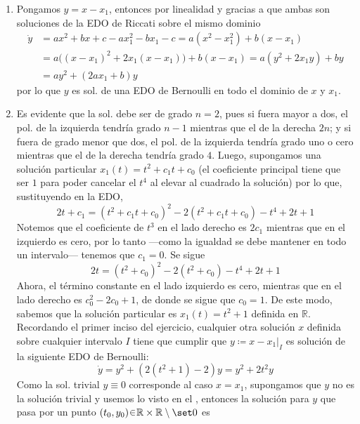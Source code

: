 \begin{sol}
\begin{enumerate}[label = (\alph*)]
    \item Pongamos $y = x - x_1$, entonces por linealidad y gracias a que ambas son soluciones de la EDO de Riccati sobre el mismo dominio
    \begin{align*}
        \dot{y}%
        &= ax^2 + bx + c - ax_1^2 - bx_1 - c = a(x^2 - x_1^2) + b(x-x_1)\\
        &= a\big((x - x_1)^2 + 2x_1(x - x_1)\big) + b(x - x_1)%
        = a(y^2 + 2x_1y) + by\\
        &= ay^2 + (2ax_1 + b)y
    \end{align*}
    por lo que $y$ es sol. de una EDO de Bernoulli en todo el dominio de $x$ y $x_1$.

    \item Es evidente que la sol. debe ser de grado $n=2$, pues si fuera mayor a dos, el pol. de la izquierda tendría grado $n-1$ mientras que el de la derecha $2n$; y si fuera de grado menor que dos, el pol. de la izquierda tendría grado uno o cero mientras que el de la derecha tendría grado $4$. Luego, supongamos una solución particular $x_1(t) = t^2 + c_1t + c_0$ (el coeficiente principal tiene que ser $1$ para poder cancelar el $t^4$ al elevar al cuadrado la solución) por lo que, sustituyendo en la EDO, 
    \[
        2t + c_1 = (t^2 + c_1t + c_0)^2 - 2(t^2 + c_1t + c_0) - t^4 + 2t + 1
    \]
    Notemos que el coeficiente de $t^3$ en el lado derecho es $2c_1$ mientras que en el izquierdo es cero, por lo tanto ---como la igualdad se debe mantener en todo un intervalo--- tenemos que $c_1 = 0$. Se sigue
    \[
        2t = (t^2 + c_0)^2 - 2(t^2 + c_0) - t^4 + 2t + 1
    \]
    Ahora, el término constante en el lado izquierdo es cero, mientras que en el lado derecho es $c_0^2 - 2c_0 + 1$, de donde se sigue que $c_0 = 1$. De este modo, sabemos que la solución particular es $x_1(t) = t^2 + 1$ definida en $\mathbb{R}$. Recordando el primer inciso del ejercicio, cualquier otra solución $x$ definida sobre cualquier intervalo $I$ tiene que cumplir que $y \coloneq x - x_1|_I$ es solución de la siguiente EDO de Bernoulli:
    \[
        \dot{y} = y^2 + (2(t^2 + 1) - 2)y = y^2 + 2t^2y
    \]
    Como la sol. trivial $y \equiv 0$ corresponde al caso $x = x_1$, supongamos que $y$ no es la solución trivial y usemos lo visto en el , entonces la solución para $y$ que pasa por un punto $(t_0,y_0) \en \mathbb{R} \times \mathbb{R}\setminus\set0$ es
    \begin{align*}

\end{align*}
\end{enumerate}
\end{sol}
